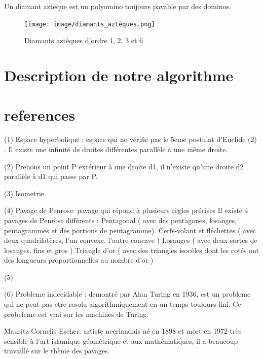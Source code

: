 \documentclass{article}
\begin{document}
Un diamant azteque est un polyomino toujours pavable par des dominos.


\begin{figure} [h]
    \center
    \texttt{[image: image/diamants\_aztèques.png]}
    \caption{Diamants aztèques d'ordre 1, 2, 3 et 6}
\end{figure}

\section{Description de notre algorithme}

\section{references}

 (1)	Espace hyperbolique : espace qui ne vérifie pas le 5eme postulat d’Euclide (2) . Il existe une infinité de droites différentes parallèle à une même droite.

(2)	Prenons un point  P extérieur à une droite d1, il n’existe qu’une droite d2 parallèle à d1 qui passe par P.

(3)	Isometrie.

(4)	Pavage de Penrose: pavage qui répond à plusieurs règles précises Il existe 4 pavages de Penrose différents :
Pentagonal ( avec des pentagones, losanges, pentagrammes et des portions de pentagramme).
Cerfs-volant et fléchettes ( avec deux quadrilatères, l'un convexe, l'autre concave )
Losanges ( avec deux sortes de losanges, fins et gros )
Triangle d’or ( avec des triangles isocèles dont les cotés ont des longueurs proportionnelles au nombre d’or )

(5)

(6)	Probleme indecidable : demontré par Alan Turing en 1936, est un probleme qui ne peut pas etre resolu algorithmiquement en un temps toujours fini. Ce probeleme est vrai sur les machines de Turing.

Mauritz Cornelis Escher: artiste neerlandais né en 1898 et mort en 1972 très sensible à l’art islamique géométrique et aux mathématiques, il a beaucoup travaillé sur le thème des pavages.
\end{document}
